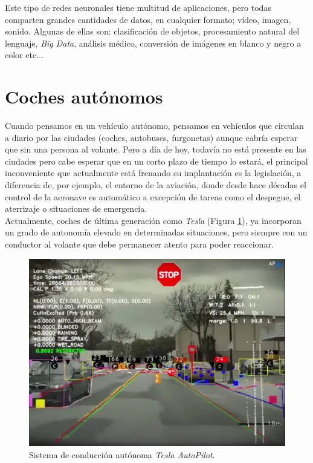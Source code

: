 Este tipo de redes neuronales tiene multitud de aplicaciones, pero todas comparten grandes cantidades de datos, en cualquier formato; vídeo, imagen, sonido. Algunas de ellas son: clasificación de objetos, procesamiento natural del lenguaje, \textit{Big Data}, análisis médico, conversión de imágenes en blanco y negro a color etc...\\

\section{Coches autónomos}
\label{sec:cochesautonomos}
Cuando pensamos en un vehículo autónomo, pensamos en vehículos que circulan a diario por las ciudades (coches, autobuses, furgonetas) aunque cabría esperar que sin una persona al volante. Pero a día de hoy, todavía no está presente en las ciudades pero cabe esperar que en un corto plazo de tiempo lo estará, el principal inconveniente que actualmente está frenando su implantación es la legislación, a diferencia de, por ejemplo, el entorno de la aviación, donde desde hace décadas el control de la aeronave es automático a excepción de tareas como el despegue, el aterrizaje o situaciones de emergencia.\\

Actualmente, coches de última generación como \textit{Tesla} (Figura \ref{fig:teslaobjectdetection}), ya incorporan un grado de autonomía elevado en determinadas situaciones, pero siempre con un conductor al volante que debe permanecer atento para poder reaccionar.\\

\begin{figure} [h!]
	\begin{center}
		\includegraphics[width=12cm]{figs/teslaobjectdetection}
	\end{center}
	\caption{Sistema de conducción autónoma \textit{Tesla AutoPilot}.}
	\label{fig:teslaobjectdetection}
\end{figure}\

